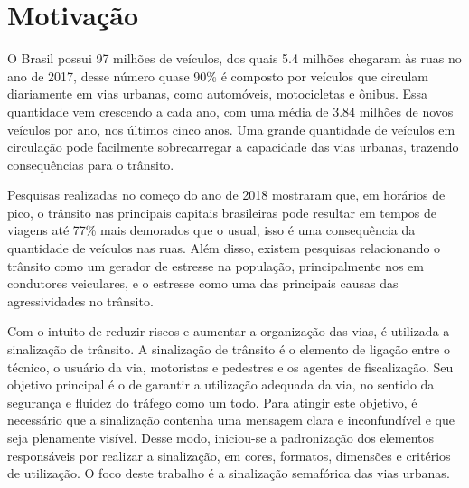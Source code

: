 \section{Motivação}

O Brasil possui 97 milhões de veículos, dos quais 5.4 milhões chegaram às ruas no ano de 2017, desse número quase 90\% é composto por veículos que circulam diariamente em vias urbanas, como automóveis, motocicletas e ônibus. Essa quantidade vem crescendo a cada ano, com uma média de 3.84 milhões de novos veículos por ano, nos últimos cinco anos. %
Uma grande quantidade de veículos em circulação pode facilmente sobrecarregar a capacidade das vias urbanas, trazendo consequências para o trânsito.

Pesquisas realizadas no começo do ano de 2018 mostraram que, em horários de pico, o trânsito nas principais capitais brasileiras pode resultar em tempos de viagens até 77\% mais demorados que o usual, %
isso é uma consequência da quantidade de veículos nas ruas. Além disso, existem pesquisas relacionando o trânsito como um gerador de estresse na população, principalmente nos em condutores veiculares, e o estresse como uma das principais causas das agressividades no trânsito.  %

Com o intuito de reduzir riscos e aumentar a organização das vias, é utilizada a sinalização de trânsito. A sinalização de trânsito é o elemento de ligação entre o técnico, o usuário da via, motoristas e pedestres e os agentes de fiscalização. Seu objetivo principal é o de garantir a utilização adequada da via, no sentido da segurança e fluidez do tráfego como um todo. Para atingir este objetivo, é necessário que a sinalização contenha uma mensagem clara e inconfundível e que seja plenamente visível. Desse modo, iniciou-se a padronização dos elementos responsáveis por realizar a sinalização, em cores, formatos, dimensões e critérios de utilização. %
O foco deste trabalho é a sinalização semafórica das vias urbanas.

